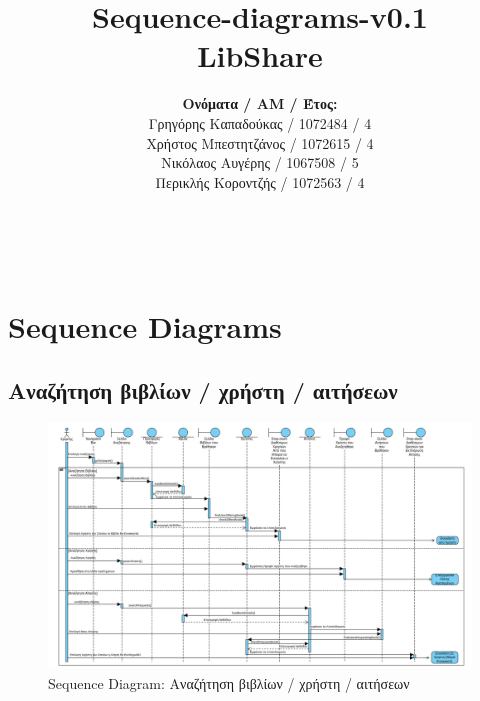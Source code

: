 \documentclass[12pt,a4paper]{article}
\title{Sequence-diagrams-v0.1 \\ LibShare}
\author{\textbf{Ονόματα / ΑΜ / Έτος:} \\ Γρηγόρης Καπαδούκας / 1072484 / 4\textdegree \\ Χρήστος Μπεστητζάνος / 1072615 / 4\textdegree \\ Νικόλαος Αυγέρης / 1067508 / 5\textdegree \\ Περικλής Κοροντζής / 1072563 / 4\textdegree}
\begin{document}
\makeatletter
\begin{center}
	\LARGE{\@title} \\
	\pagebreak
    \begin{LARGE}\@author\end{LARGE}
    \pagebreak
\end{center}

\section{Sequence Diagrams}

\subsection{Αναζήτηση βιβλίων / χρήστη / αιτήσεων}
\begin{figure}[H]
	\includegraphics[width=\textwidth]{Search Sequence.png}
	\caption{Sequence Diagram: Αναζήτηση βιβλίων / χρήστη / αιτήσεων}
	\label{Sequence Diagram: Αναζήτηση βιβλίων / χρήστη / αιτήσεων}
\end{figure}
\end{document}
